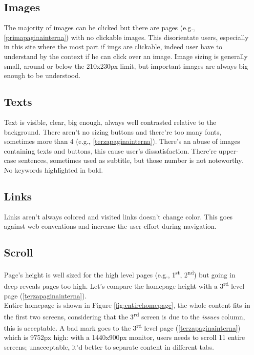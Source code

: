 \documentclass[
10pt, %
a4paper, %
oneside, %
headinclude,footinclude, %
BCOR5mm, %
]{scrartcl}
\begin{document}
	\subsection{Images}
	The majority of images can be clicked but there are pages (e.g., \ref{primapaginainterna}) with no clickable images. This disorientate users, especially in this site where the most part if imgs are clickable, indeed user have to understand by the context if he can click over an image.
	Image sizing is generally small, around or below the 210x230px limit, but important images are always big enough to be understood.

	\subsection{Texts}
	Text is visible, clear, big enough, always well contrasted relative to the background. There aren't no sizing buttons and there're too many fonts, sometimes more than 4 (e.g., \ref{terzapaginainterna}).
	There's an abuse of images containing texts and buttons, this cause user's dissatisfaction. 
	There're upper-case sentences, sometimes used as subtitle, but those number is not noteworthy. No keywords highlighted in bold.

	\subsection{Links}
	Links aren't always colored and visited links doesn't change color. This goes against web conventions and increase the user effort during navigation. 

	\subsection{Scroll}
	Page's height is well sized for the high level pages (e.g., 1\textsuperscript{st}, 2\textsuperscript{nd}) but going in deep reveals pages too high. Let's compare the homepage height with a 3\textsuperscript{rd} level page (\ref{terzapaginainterna}). \\
	Entire homepage is shown in Figure \ref{fig:entirehomepage}, the whole content fits in the first two screens, considering that the 3\textsuperscript{rd} screen is due to the \emph{issues} column, this is acceptable.
	A bad mark goes to the 3\textsuperscript{rd} level page (\ref{terzapaginainterna}) which is 9752px high: with a 1440x900px monitor, users needs to scroll 11 entire screens; unacceptable, it'd better to separate content in different tabs. 
\end{document}

